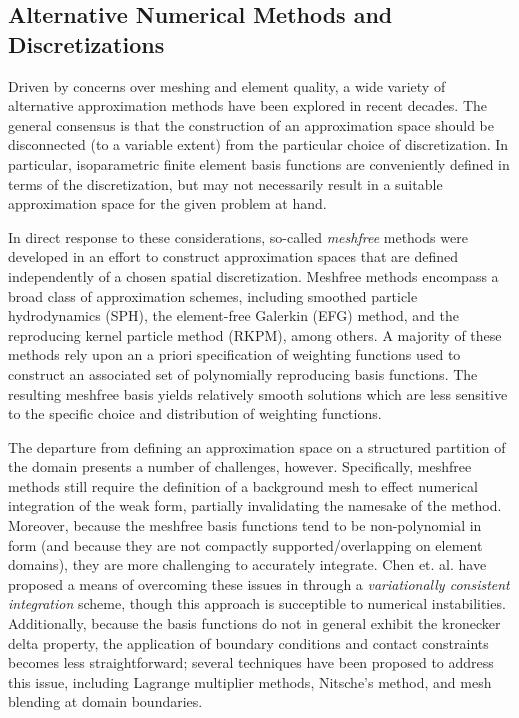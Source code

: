 	\subsection*{Alternative Numerical Methods and Discretizations}
		Driven by concerns over meshing and element quality, a wide variety of alternative approximation methods have been explored in recent decades. The general consensus is that the construction of an approximation space should be disconnected (to a variable extent) from the particular choice of discretization. In particular, isoparametric finite element basis functions are conveniently defined in terms of the discretization, but may not necessarily result in a suitable approximation space for the given problem at hand.
		
		In direct response to these considerations, so-called \textit{meshfree} methods were developed in an effort to construct approximation spaces that are defined independently of a chosen spatial discretization. Meshfree methods encompass a broad class of approximation schemes, including smoothed particle hydrodynamics (SPH), the element-free Galerkin (EFG) method, and the reproducing kernel particle method (RKPM), among others. A majority of these methods rely upon an a priori specification of weighting functions used to construct an associated set of polynomially reproducing basis functions. The resulting meshfree basis yields relatively smooth solutions which are less sensitive to the specific choice and distribution of weighting functions.
		
		The departure from defining an approximation space on a structured partition of the domain presents a number of challenges, however. Specifically, meshfree methods still require the definition of a background mesh to effect numerical integration of the weak form, partially invalidating the namesake of the method. Moreover, because the meshfree basis functions tend to be non-polynomial in form (and because they are not compactly supported/overlapping on element domains), they are more challenging to accurately integrate. Chen et. al. have proposed a means of overcoming these issues in \cite{Chen:13} through a \textit{variationally consistent integration} scheme, though this approach is succeptible to numerical instabilities. Additionally, because the basis functions do not in general exhibit the kronecker delta property, the application of boundary conditions and contact constraints becomes less straightforward; several techniques have been proposed to address this issue, including Lagrange multiplier methods, Nitsche's method, and mesh blending at domain boundaries.
			
